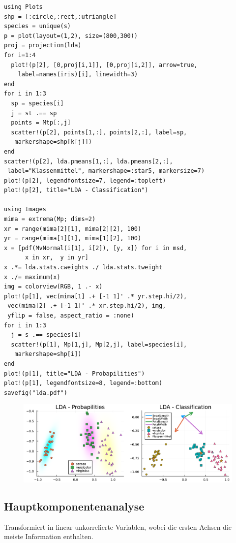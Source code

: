 \documentclass[10pt,twocolumn]{scrartcl}
\begin{document}
\begin{lstlisting}
using Plots
shp = [:circle,:rect,:utriangle]
species = unique(s)
p = plot(layout=(1,2), size=(800,300))
proj = projection(lda)
for i=1:4
  plot!(p[2], [0,proj[i,1]], [0,proj[i,2]], arrow=true,
    label=names(iris)[i], linewidth=3)
end
for i in 1:3
  sp = species[i]
  j = st .== sp
  points = Mtp[:,j]
  scatter!(p[2], points[1,:], points[2,:], label=sp,
   markershape=shp[k[j]])
end
scatter!(p[2], lda.pmeans[1,:], lda.pmeans[2,:],
 label="Klassenmittel", markershape=:star5, markersize=7)
plot!(p[2], legendfontsize=7, legend=:topleft)
plot!(p[2], title="LDA - Classification")

using Images
mima = extrema(Mp; dims=2)
xr = range(mima[2][1], mima[2][2], 100)
yr = range(mima[1][1], mima[1][2], 100)
x = [pdf(MvNormal(i[1], i[2]), [y, x]) for i in msd,
      x in xr,  y in yr]
x .*= lda.stats.cweights ./ lda.stats.tweight
x ./= maximum(x)
img = colorview(RGB, 1 .- x)
plot!(p[1], vec(mima[1] .+ [-1 1]' .* yr.step.hi/2),
 vec(mima[2] .+ [-1 1]' .* xr.step.hi/2), img,
 yflip = false, aspect_ratio = :none)
for i in 1:3
  j = s .== species[i]
  scatter!(p[1], Mp[1,j], Mp[2,j], label=species[i],
   markershape=shp[i])
end
plot!(p[1], title="LDA - Probapilities")
plot!(p[1], legendfontsize=8, legend=:bottom)
savefig("lda.pdf")
\end{lstlisting}

\begin{figure}[ht]
  \centering
  \includegraphics[width=.95\columnwidth]{lda.pdf}
\end{figure}

\subsection{Hauptkomponentenanalyse}

Transformiert in linear unkorrelierte Variablen, wobei die ersten Achsen die
meiste Information enthalten.
\end{document}
